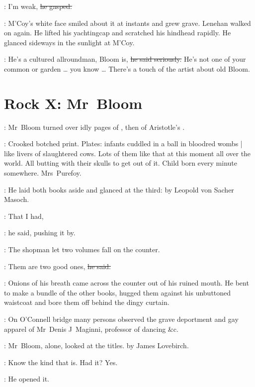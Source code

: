 \lenehan:
I'm weak,
\sout{he gasped.}

:
M'Coy's white face smiled about it at instants and grew grave.
Lenehan walked on again.
He lifted his yachtingcap and scratched his hindhead rapidly.%
He glanced sideways in the sunlight at M'Coy.

\lenehan:
He's a cultured allroundman,
Bloom is,
\sout{he said seriously.}
He's not one of your common or garden \ldots
you know \ldots
There's a touch of the artist about old Bloom.


\section*{Rock X: Mr~Bloom}


:
Mr~Bloom turned over idly pages of
,
then of Aristotle's .

\BloomInt:
Crooked botched print.
Plates:
infants cuddled in a ball in bloodred wombs |
like livers of slaughtered cows.
Lots of them like that at this moment all over the world.
All butting with their skulls to get out of it.
Child born every minute somewhere.
Mrs~Purefoy.%

:
He laid both books aside and glanced at the third:
by Leopold von Sacher Masoch.

\Bloom:
That I had,

:
he said,
pushing it by.

:
The shopman let two volumes fall on the counter.

\shopman:
Them are two good ones,
\sout{he said.}

:
Onions of his breath came across the counter
out of his ruined mouth.
He bent to make a bundle of the other books,
hugged them against his unbuttoned waistcoat
and bore them off behind the dingy curtain.

\begin{interject}
    :
    On O'Connell bridge
    many persons observed the grave deportment
    and gay apparel of Mr~Denis J~Maginni,
    professor of dancing \&c.
\end{interject}%

:
Mr~Bloom, alone,
looked at the titles.
 by James Lovebirch.

\BloomInt:
Know the kind that is.
Had it?
Yes.

:
He opened it.

